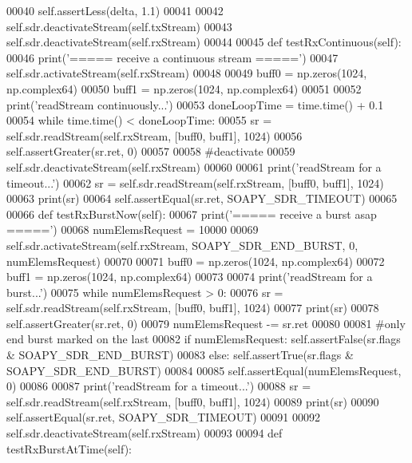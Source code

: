 \begin{DoxyCode}
{{{00040         self.assertLess(delta, 1.1)
00041 
00042         self.sdr.deactivateStream(self.txStream)
00043         self.sdr.deactivateStream(self.rxStream)
00044 
00045     \textcolor{keyword}{def }testRxContinuous(self):
00046         print(\textcolor{stringliteral}{'===== receive a continuous stream ====='})
00047         self.sdr.activateStream(self.rxStream)
00048 
00049         buff0 = np.zeros(1024, np.complex64)
00050         buff1 = np.zeros(1024, np.complex64)
00051 
00052         print(\textcolor{stringliteral}{'readStream continuously...'})
00053         doneLoopTime = time.time() + 0.1
00054         \textcolor{keywordflow}{while} time.time() < doneLoopTime:
00055             sr = self.sdr.readStream(self.rxStream, [buff0, buff1], 1024)
00056             self.assertGreater(sr.ret, 0)
00057 
00058         \textcolor{comment}{#deactivate}
00059         self.sdr.deactivateStream(self.rxStream)
00060 
00061         print(\textcolor{stringliteral}{'readStream for a timeout...'})
00062         sr = self.sdr.readStream(self.rxStream, [buff0, buff1], 1024)
00063         print(sr)
00064         self.assertEqual(sr.ret, SOAPY\_SDR\_TIMEOUT)
00065 
00066     \textcolor{keyword}{def }testRxBurstNow(self):
00067         print(\textcolor{stringliteral}{'===== receive a burst asap ====='})
00068         numElemsRequest = 10000
00069         self.sdr.activateStream(self.rxStream, SOAPY\_SDR\_END\_BURST, 0, numElemsRequest)
00070 
00071         buff0 = np.zeros(1024, np.complex64)
00072         buff1 = np.zeros(1024, np.complex64)
00073 
00074         print(\textcolor{stringliteral}{'readStream for a burst...'})
00075         \textcolor{keywordflow}{while} numElemsRequest > 0:
00076             sr = self.sdr.readStream(self.rxStream, [buff0, buff1], 1024)
00077             print(sr)
00078             self.assertGreater(sr.ret, 0)
00079             numElemsRequest -= sr.ret
00080 
00081             \textcolor{comment}{#only end burst marked on the last}
00082             \textcolor{keywordflow}{if} numElemsRequest: self.assertFalse(sr.flags & SOAPY\_SDR\_END\_BURST)
00083             \textcolor{keywordflow}{else}: self.assertTrue(sr.flags & SOAPY\_SDR\_END\_BURST)
00084 
00085         self.assertEqual(numElemsRequest, 0)
00086 
00087         print(\textcolor{stringliteral}{'readStream for a timeout...'})
00088         sr = self.sdr.readStream(self.rxStream, [buff0, buff1], 1024)
00089         print(sr)
00090         self.assertEqual(sr.ret, SOAPY\_SDR\_TIMEOUT)
00091 
00092         self.sdr.deactivateStream(self.rxStream)
00093 
00094     \textcolor{keyword}{def }testRxBurstAtTime(self):
}}}
\end{DoxyCode}
